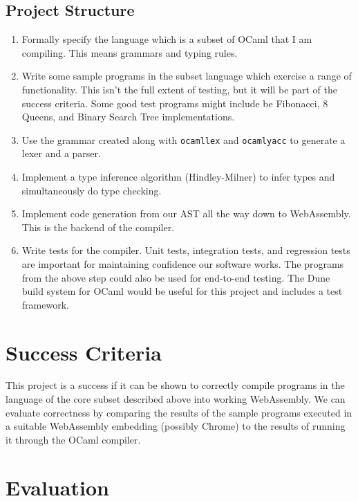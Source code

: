 \documentclass[a4paper,12pt]{article}
\begin{document}
\subsection{Project Structure}

\begin{enumerate}
   \item
      Formally specify the language which is a subset of OCaml that I am compiling.
      This means grammars and typing rules.
   \item
      Write some sample programs in the subset language which exercise a range of functionality.
      This isn't the full extent of testing, but it will be part of the success criteria.
      Some good test programs might include be Fibonacci, 8 Queens, and Binary Search Tree implementations.
   \item
      Use the grammar created along with {\tt ocamllex} and {\tt ocamlyacc} to generate a lexer and a parser.
   \item
      Implement a type inference algorithm (Hindley-Milner) to infer types and simultaneously do type checking.
   \item
      Implement code generation from our AST all the way down to WebAssembly. This is the backend of the compiler.
   \item
      Write tests for the compiler.
      Unit tests, integration tests, and regression tests are important for maintaining confidence our software works.
      The programs from the above step could also be used for end-to-end testing.
      The Dune build system for OCaml would be useful for this project and includes a test framework.

\end{enumerate}

\section{Success Criteria}

This project is a success if it can be shown to correctly compile programs in the language of the core subset described above into working WebAssembly.
We can evaluate correctness by comparing the results of the sample programs executed in a suitable WebAssembly embedding (possibly Chrome) to the results of running it through the OCaml compiler.

\section{Evaluation}
\end{document}
